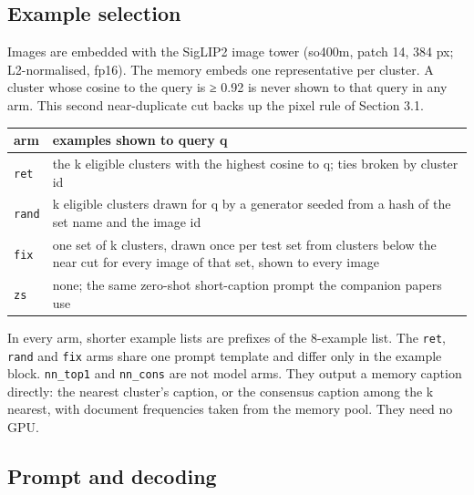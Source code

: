 \subsection{Example selection}\label{example-selection}

Images are embedded with the SigLIP2 image tower \citep{Tschannen2025SigLIP2} (so400m, patch 14, 384
px; L2-normalised, fp16). The memory embeds one representative per cluster. A cluster whose cosine
to the query is ≥ 0.92 is never shown to that query in any arm. This second near-duplicate cut backs
up the pixel rule of Section 3.1.

\begin{longtable}[]{@{}
  >{\raggedright\arraybackslash}p{}
  >{\raggedright\arraybackslash}p{}@{}}
\toprule\noalign{}
\begin{minipage}[b]{\linewidth}\raggedright
arm
\end{minipage} & \begin{minipage}[b]{\linewidth}\raggedright
examples shown to query q
\end{minipage} \\
\midrule\noalign{}
\endhead
\bottomrule\noalign{}
\endlastfoot
\texttt{ret} & the k eligible clusters with the highest cosine to q; ties broken by cluster id \\
\texttt{rand} & k eligible clusters drawn for q by a generator seeded from a hash of the set name
and the image id \\
\texttt{fix} & one set of k clusters, drawn once per test set from clusters below the near cut for
every image of that set, shown to every image \\
\texttt{zs} & none; the same zero-shot short-caption prompt the companion papers use \\
\end{longtable}

In every arm, shorter example lists are prefixes of the 8-example list. The \texttt{ret},
\texttt{rand} and \texttt{fix} arms share one prompt template and differ only in the example block.
\texttt{nn\_top1} and \texttt{nn\_cons} are not model arms. They output a memory caption directly:
the nearest cluster's caption, or the consensus caption among the k nearest, with document
frequencies taken from the memory pool. They need no GPU.

\subsection{Prompt and decoding}\label{prompt-and-decoding}

